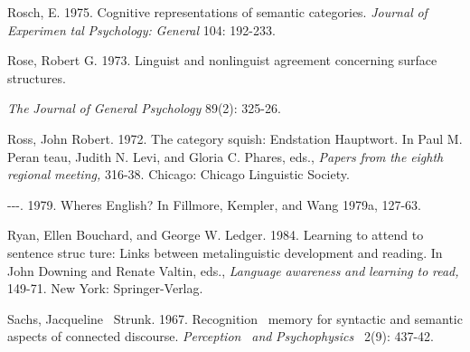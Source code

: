 \begin{styleStandard}
Rosch, E. 1975. Cognitive representations of semantic categories. \textit{Journal}\textit{ }\textit{of}\textit{ }\textit{Experimen\-}\textit{ }\textit{tal}\textit{ }\textit{Psychology:}\textit{ }\textit{General}\textit{ }104: 192-233.
\end{styleStandard}


\begin{styleStandard}
Rose, Robert G. 1973. Linguist and nonlinguist agreement concerning surface structures.
\end{styleStandard}


\begin{styleStandard}
\textit{The}\textit{ }\textit{Journal}\textit{ }\textit{of}\textit{ }\textit{General Psychology}\textit{ }89(2): 325-26.
\end{styleStandard}


\begin{styleStandard}
Ross, John Robert. 1972. The category squish: Endstation Hauptwort. In Paul M. Peran\- teau, Judith N. Levi, and Gloria C. Phares, eds., \textit{Papers}\textit{ }\textit{from}\textit{ }\textit{the}\textit{ }\textit{eighth}\textit{ }\textit{regional}\textit{ }\textit{meeting,}\textit{ }316-38. Chicago: Chicago Linguistic Society.
\end{styleStandard}


\begin{styleStandard}
{}-{}-{}-. 1979. Where{\textquotesingle}s English? In Fillmore, Kempler, and Wang 1979a, 127-63.
\end{styleStandard}


\begin{styleStandard}
Ryan, Ellen Bouchard, and George W. Ledger. 1984. Learning to attend to sentence struc\- ture: Links between metalinguistic development and reading. In John Downing and Renate Valtin, eds., \textit{Language}\textit{ }\textit{awareness}\textit{ }\textit{and}\textit{ }\textit{learning}\textit{ }\textit{to}\textit{ }\textit{read,}\textit{ }149-71. New York: Springer-Verlag.
\end{styleStandard}


\begin{styleStandard}
Sachs, Jacqueline \ Strunk. 1967. Recognition \ memory for syntactic and semantic aspects of connected discourse. \textit{Perception }\textit{\ }\textit{and}\textit{ }\textit{Psychophysics }\textit{\ }2(9): 437-42.
\end{styleStandard}


